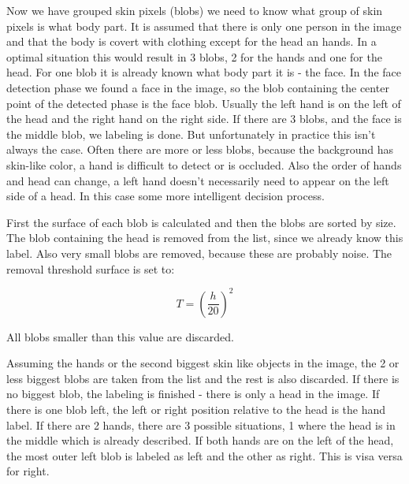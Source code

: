 Now we have grouped skin pixels (blobs) we need to know what group of skin pixels is what body part. It is assumed that there is only one person in the image and that the body is covert with clothing except for the head an hands. In a optimal situation this would result in 3 blobs, 2 for the hands and one for the head. For one blob it is already known what body part it is - the face. In the face detection phase we found a face in the image, so the blob containing the center point of the detected phase is the face blob. Usually the left hand is on the left of the head and the right hand on the right side. If there are 3 blobs, and the face is the middle blob, we labeling is done. But unfortunately in practice this isn't always the case. Often there are more or less blobs, because the background has skin-like color, a hand is difficult to detect or is occluded. Also the order of hands and head can change, a left hand doesn't necessarily need to appear on the left side of a head. In this case some more intelligent decision process. 

First the surface of each blob is calculated and then the blobs are sorted by size. The blob containing the head is removed from the list, since we already know this label. Also very small blobs are removed, because these are probably noise. The removal threshold surface is set to:

\begin{equation}
T = (\frac{h}{20})^2
\end{equation}

All blobs smaller than this value are discarded. 

Assuming the hands or the second biggest skin like objects in the image, the 2 or less biggest blobs are taken from the list and the rest is also discarded. If there is no biggest blob, the labeling is finished - there is only a head in the image. If there is one blob left, the left or right position relative to the head is the hand label. If there are 2 hands, there are 3 possible situations, 1 where the head is in the middle which is already described. If both hands are on the left of the head, the most outer left blob is labeled as left and the other as right. This is visa versa for right.

